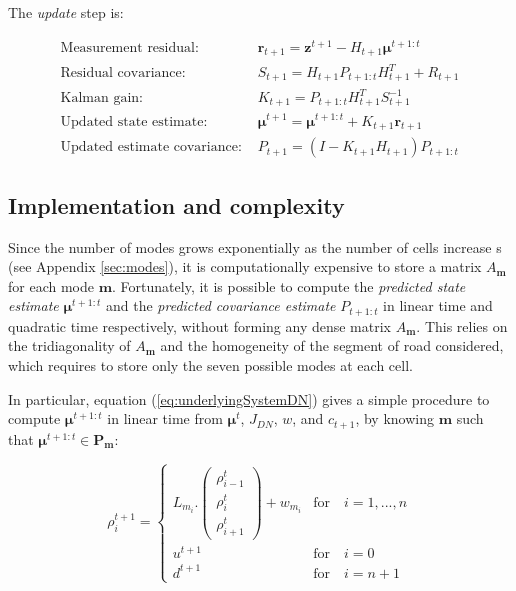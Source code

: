 \noindent The \textit{update} step is:

\begin{equation}
\begin{array}{ll}
\text{Measurement residual: } & \boldsymbol r_{t+1} = \boldsymbol z^{t+1} - H_{t+1}\boldsymbol\mu^{t+1:t}\\
\text{Residual covariance: } & S_{t+1} = H_{t+1}P_{t+1:t}H_{t+1}^{T}+R_{t+1}\\
\text{Kalman gain: } & K_{t+1} = P_{t+1:t}H_{t+1}^{T}S_{t+1}^{-1}\\
\text{Updated state estimate: } & \boldsymbol\mu^{t+1} = \boldsymbol\mu^{t+1:t} + K_{t+1} \boldsymbol r_{t+1}\\
\text{Updated estimate covariance: } & P_{t+1} = (I - K_{t+1}H_{t+1})P_{t+1:t}
\end{array}
\label{eq:update}
\end{equation}

\subsection{Implementation and complexity}\label{sec:implementation}

Since the number of modes grows exponentially as the number of cells increase
s (see Appendix \ref{sec:modes}), it is computationally expensive to store a matrix $A_{\boldsymbol m}$ for each mode $\boldsymbol m$. Fortunately, it is possible to compute the \textit{predicted state estimate} $\boldsymbol\mu^{t+1:t}$ and the \textit{predicted covariance estimate} $P_{t+1:t}$ in linear time and quadratic time respectively, without forming any dense matrix $A_{\boldsymbol m}$. This relies on the tridiagonality of $A_{\boldsymbol m}$ and the homogeneity of the segment of road considered, which requires to store only the seven possible modes at each cell\footnotemark.


In particular, equation (\ref{eq:underlyingSystemDN}) gives a simple procedure to compute $\boldsymbol\mu^{t+1:t}$ in linear time from $\boldsymbol\mu^{t}$, $J_{DN}$, $w$, and $c_{t+1}$, by knowing $\boldsymbol m$ such that $\boldsymbol\mu^{t+1:t}\in\textbf{P}_{\boldsymbol m}$:

\begin{equation}
\rho^{t+1}_{i} = \begin{cases}
L_{m_{i}}.\left( \begin{array}{c}
\rho^{t}_{i-1}\\
\rho^{t}_{i}\\
\rho^{t}_{i+1}
\end{array} \right)
+ w_{m_{i}} & \text{for}\quad i=1,...,n\\
u^{t+1} & \text{for}\quad i=0\\
d^{t+1} & \text{for}\quad i=n+1
\end{cases}
\label{eq:underlyingSystemDNcopy}
\end{equation}

